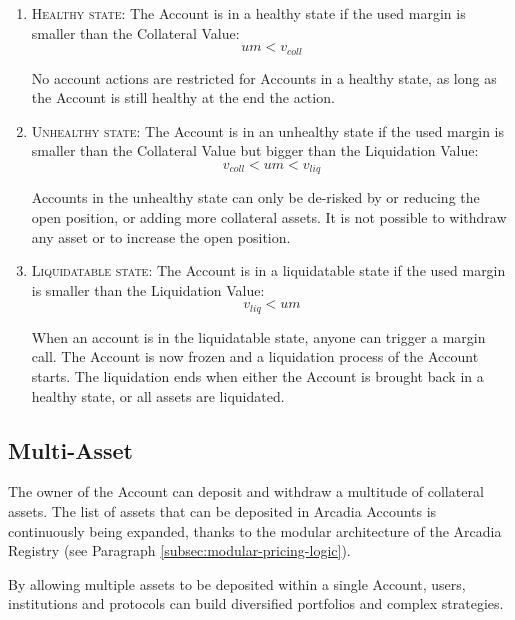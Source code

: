 \documentclass[sigconf,nonacm]{acmart}
\begin{document}
\begin{enumerate}
    \item \textsc{Healthy state:} The Account is in a healthy state if the used margin is smaller than the Collateral Value:
        \begin{equation}
            um < v_{coll}
        \end{equation}

        No account actions are restricted for Accounts in a healthy state, as long as the Account is still healthy at the end the action.
    \item \textsc{Unhealthy state:} The Account is in an unhealthy state if the used margin is smaller than the Collateral Value but bigger than the Liquidation Value:
        \begin{equation}
            v_{coll} < um < v_{liq}
        \end{equation}
        
        Accounts in the unhealthy state can only be de-risked by or reducing the open position, or adding more collateral assets.
        It is not possible to withdraw any asset or to increase the open position.
    \item \textsc{Liquidatable state:} The Account is in a liquidatable state if the used margin is smaller than the Liquidation Value:
        \begin{equation}
            v_{liq} < um
        \end{equation}
        
        When an account is in the liquidatable state, anyone can trigger a margin call.
        The Account is now frozen and a liquidation process of the Account starts.
        The liquidation ends when either the Account is brought back in a healthy state, or all assets are liquidated.
\end{enumerate}

\subsection{Multi-Asset}
\label{subsec:multi-asset}
The owner of the Account can deposit and withdraw a multitude of collateral assets.
The list of assets that can be deposited in Arcadia Accounts is continuously being expanded, thanks to the modular architecture of the Arcadia Registry (see Paragraph \ref{subsec:modular-pricing-logic}).

By allowing multiple assets to be deposited within a single Account, users, institutions and protocols can build diversified portfolios and complex strategies.
\end{document}

